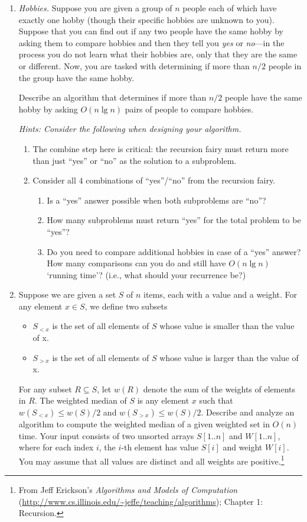 \documentclass[letterpaper,11pt]{article}
\begin{document}
\begin{enumerate}

\item \emph{Hobbies.} Suppose you are given a group of $n$ people each of which have exactly one hobby (though their specific hobbies are unknown to you). Suppose that you can find out if any two people have the same hobby by asking them to compare hobbies and then they tell you \emph{yes} or \emph{no}---in the process you do not learn what their hobbies are, only that they are the same or different. Now, you are tasked with determining if more than $n/2$ people in the group have the same hobby. 

Describe an algorithm that determines if more than $n/2$ people have the same hobby by asking $O(n\lg n)$ pairs of people to compare hobbies.

\emph{Hints: Consider the following when designing your algorithm.}
\begin{enumerate}
\item The combine step here is critical: the recursion fairy must return more than just ``yes'' or ``no'' as the solution to a subproblem.
\item Consider all $4$ combinations of ``yes''/``no'' from the recursion fairy. 
\begin{enumerate}
\item Is a ``yes'' answer possible when both subproblems are ``no''?
\item How many subproblems must return ``yes'' for the total problem to be ``yes''?
\item Do you need to compare additional hobbies in case of a ``yes'' answer? How many comparisons can you do and still have $O(n\lg n)$ `running time'? (i.e., what should your recurrence be?)
\end{enumerate}
\end{enumerate}

\newpage
\item Suppose we are given a set $S$ of $n$ items, each with a value and a weight. For any element
$x \in S$, we define two subsets
\begin{itemize}
\item $S_{<x}$ is the set of all elements of $S$ whose value is smaller than the value of x.  
\item $S_{>x}$ is the set of all elements of $S$ whose value is larger than the value of x.
\end{itemize}
For any subset $R \subseteq S$, let $w(R)$ denote the sum of the weights of elements in $R$. The
weighted median of $S$ is any element $x$ such that $w(S_{<x}) \leq w(S)/2$ and $w(S_{>x}) \leq w(S)/2$.
Describe and analyze an algorithm to compute the weighted median of a given weighted
set in $O(n)$ time. Your input consists of two unsorted arrays $S[1..n]$ and $W[1..n]$, where
for each index $i$, the $i$-th element has value $S[i]$ and weight $W[i]$. You may assume that all
values are distinct and all weights are positive.\footnote{From Jeff Erickson's \emph{Algorithms and Models of Computation} (\url{http://www.cs.illinois.edu/~jeffe/teaching/algorithms}); Chapter 1: Recursion.}




\end{enumerate}
\end{document}
